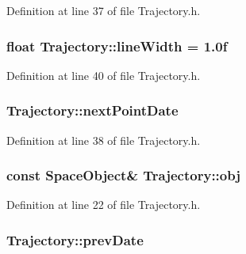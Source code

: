 Definition at line 37 of file Trajectory.\+h.

\hypertarget{class_trajectory_a7cf337f408aa8f27d93c68d40d5030ce}{
\subsubsection[{line\+Width}]{\setlength{\rightskip}{0pt plus 5cm}float Trajectory\+::line\+Width = 1.\+0f\hspace{0.3cm}{\ttfamily [protected]}}}\label{class_trajectory_a7cf337f408aa8f27d93c68d40d5030ce}


Definition at line 40 of file Trajectory.\+h.

\hypertarget{class_trajectory_ab04d69563f531cfbdf3f61f107592d44}{
\subsubsection[{next\+Point\+Date}]{ Trajectory\+::next\+Point\+Date\hspace{0.3cm}{\ttfamily [protected]}}}\label{class_trajectory_ab04d69563f531cfbdf3f61f107592d44}


Definition at line 38 of file Trajectory.\+h.

\hypertarget{class_trajectory_a7e553e1118e6a4accfacb8fae0d24f2b}{
\subsubsection[{obj}]{\setlength{\rightskip}{0pt plus 5cm}const {\bf Space\+Object}\& Trajectory\+::obj\hspace{0.3cm}{\ttfamily [protected]}}}\label{class_trajectory_a7e553e1118e6a4accfacb8fae0d24f2b}


Definition at line 22 of file Trajectory.\+h.

\hypertarget{class_trajectory_a6d2fbd4cfaec29cfdf4f801318a88f3d}{
\subsubsection[{prev\+Date}]{ Trajectory\+::prev\+Date\hspace{0.3cm}{\ttfamily [protected]}}}\label{class_trajectory_a6d2fbd4cfaec29cfdf4f801318a88f3d}


